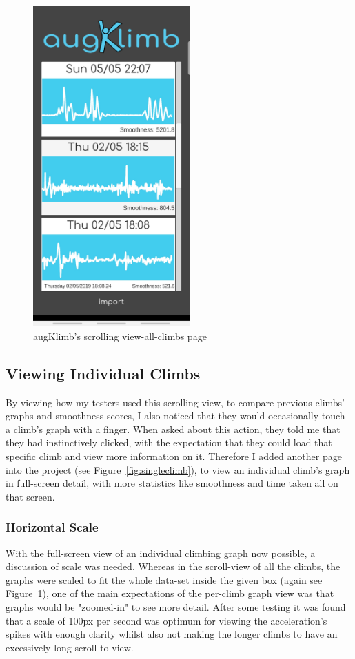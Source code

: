 \begin{figure}[h]
\centering
\includegraphics[width=6cm]{imgs/scrollview}
\caption{augKlimb's scrolling view-all-climbs page}
\label{fig:scrollview}
\end{figure}


\subsection{Viewing Individual Climbs}
By viewing how my testers used this scrolling view, to compare previous climbs' graphs and smoothness scores, I also noticed that they would occasionally touch a climb's graph with a finger.
When asked about this action, they told me that they had instinctively clicked, with the expectation that they could load that specific climb and view more information on it.
Therefore I added another page into the project (see Figure~\ref{fig:singleclimb}), to view an individual climb's graph in full-screen detail, with more statistics like smoothness and time taken all on that screen.


\subsubsection{Horizontal Scale}
With the full-screen view of an individual climbing graph now possible, a discussion of scale was needed. 
Whereas in the scroll-view of all the climbs, the graphs were scaled to fit the whole data-set inside the given box (again see Figure~\ref{fig:scrollview}), one of the main expectations of the per-climb graph view was that graphs would be "zoomed-in" to see more detail.
After some testing it was found that a scale of 100px per second was optimum for viewing the acceleration's spikes with enough clarity whilst also not making the longer climbs to have an excessively long scroll to view. 

